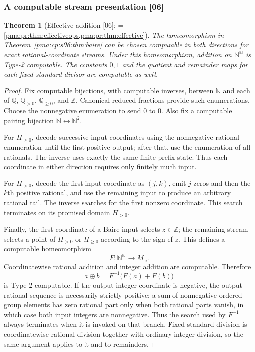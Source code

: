 \documentclass[11pt]{article}
\numberwithin{equation}{section}
\newtheorem{theorem}{Theorem}[section]
\theoremstyle{definition}
\theoremstyle{remark}
\newcommand{\N}{\mathbb N}
\newcommand{\Z}{\mathbb Z}
\newcommand{\Q}{\mathbb Q}
\newcommand{\Baire}{\N^{\N}}
\newcommand{\src}[1]{\textup{\textsf{\small[#1]}}}
\begin{document}
\subsubsection{A computable stream presentation \src{06}}

\begin{theorem}[Effective addition \src{06}; = \cref{pma:pr:thm:effectiveops,pma:pr:thm:effective}]
\label{pma:cp:thm:effective}
The homeomorphism in Theorem~\ref{pma:cp:s06:thm:baire} can be chosen computable in
both directions for exact rational-coordinate streams. Under this
homeomorphism, addition on $\Baire$ is Type-2 computable. The constants
$0,1$ and the quotient and remainder maps for each fixed standard divisor
are computable as well.
\end{theorem}

\begin{proof}
Fix computable bijections, with computable inverses, between $\N$ and
each of $\Q$, $\Q_{>0}$, $\Q_{\geq0}$, and $\Z$. Canonical reduced
fractions provide such enumerations. Choose the nonnegative enumeration
to send $0$ to $0$. Also fix a computable pairing bijection
$\N\leftrightarrow\N^2$.

For $H_{\geq0}$, decode successive input coordinates using the
nonnegative rational enumeration until the first positive output; after
that, use the enumeration of all rationals. The inverse uses exactly
the same finite-prefix state. Thus each coordinate in either direction
requires only finitely much input.

For $H_{>0}$, decode the first input coordinate as $(j,k)$, emit $j$
zeros and then the $k$th positive rational, and use the remaining input
to produce an arbitrary rational tail. The inverse searches for the
first nonzero coordinate. This search terminates on its promised
domain $H_{>0}$.

Finally, the first coordinate of a Baire input selects $z\in\Z$; the
remaining stream selects a point of $H_{>0}$ or $H_{\geq0}$ according to
the sign of $z$. This defines a computable homeomorphism
\[
 F:\Baire\longrightarrow M_\omega.
\]
Coordinatewise rational addition and integer addition are computable.
Therefore
\[
 a\oplus b=F^{-1}\bigl(F(a)+F(b)\bigr)
\]
is Type-2 computable. If the output integer coordinate is negative, the
output rational sequence is necessarily strictly positive: a sum of
nonnegative ordered-group elements has zero rational part only when
both rational parts vanish, in which case both input integers are
nonnegative. Thus the search used by $F^{-1}$ always terminates when it
is invoked on that branch. Fixed standard division is coordinatewise
rational division together with ordinary integer division, so the same
argument applies to it and to remainders.
\end{proof}
\end{document}

